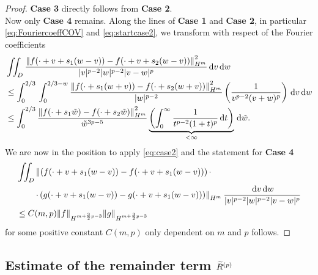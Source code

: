 \begin{proof}
	\textbf{Case 3} directly follows from \textbf{Case 2}. \\
	Now only \textbf{Case 4} remains. Along the lines of \textbf{Case 1} and \textbf{Case 2}, in particular \eqref{eq:FouriercoeffCOV} and \eqref{eq:startcase2}, we transform with respect of the Fourier coefficients 
	\begin{align*}
	& \iint_D   \frac{ \left\| f(\cdot+v+s_1(w-v)) - f(\cdot+v+s_2(w-v)) \right\|^2_{H^m}}{|v|^{p-2}|w|^{p-2}|v-w|^{p}}  \,\mathrm{d} v \,\mathrm{d} w \\
	& \le \int_0^{2/3} \, \int_0^{2/3-w} \frac{ \left\| f(\cdot+s_1(w+v)) - f(\cdot+s_2(w+v)) \right\|^2_{H^m}}{|w|^{p-2}} \left(  \frac{1}{v^{p-2}(v+w)^p} \right) \,\mathrm{d} v  \,\mathrm{d} w \\
	& \leq \int_{0}^{2/3}  \frac{ \left\| f(\cdot+s_1\tilde{w}) - f(\cdot+s_2\tilde{w}) \right\|^2_{H^m}}{\tilde{w}^{3p-5}}  \underbrace{\left( \int_0^{\infty} \frac{1}{t^{p-2}(1+t)^{p}} \,\mathrm{d} t \right)}_{<\infty} \,\mathrm{d} \tilde{w}.
	\end{align*}
	We are now in the position to apply \eqref{eq:case2} and the statement for \textbf{Case 4}
	\begin{align*}
	& \iint_D   \left\| \left(f(\cdot+v + s_1(w-v)) - f(\cdot+v + s_1(w-v)) \right) \cdot\right.\\
    & \qquad \left.\cdot \left(g(\cdot+v + s_1(w-v)) - g(\cdot+v + s_1(w-v)) \right) \right\|_{H^m} \frac {\,\mathrm{d} v \,\mathrm{d} w} {|v|^{p-2}|w|^{p-2}|v-w|^{p}}  \\
	& \leq C(m,p) \|f\|_{H^{m+\frac 32 p -3}} \|g\|_{H^{m+\frac 32 p -3}}
	\end{align*}
	for some positive constant $C(m,p)$ only dependent on $m$ and $p$
	follows. 
\end{proof}



\subsection{Estimate of the remainder term \texorpdfstring{$\widetilde R^{(p)}$}{R(p)}} 





